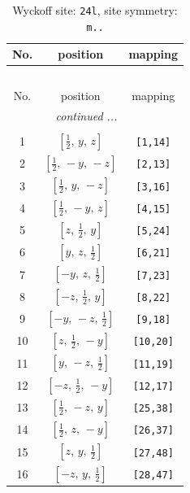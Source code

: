 \documentclass[fleqn,8pt]{jsarticle}
\begin{document}
\renewcommand{\arraystretch}{1.2}
\begin{longtable}{ccc}
\caption{Wyckoff site: {\tt 24l}, site symmetry: {\tt m..}}
 \\
 \hline \hline
No. & position & mapping \\ \hline \endfirsthead

\multicolumn{2}{l}{\tablename\ \thetable{}} \\
 \hline \hline
No. & position & mapping \\ \hline \endhead

 \hline \hline
\multicolumn{2}{r}{\footnotesize\it continued ...} \\ \endfoot

 \hline \hline
\multicolumn{2}{r}{} \\ \endlastfoot

1 & $\left[ \frac{1}{2},\, y,\, z \right]$ & {\tt [1,14]} \\ \hline
2 & $\left[ \frac{1}{2},\, - y,\, - z \right]$ & {\tt [2,13]} \\ \hline
3 & $\left[ \frac{1}{2},\, y,\, - z \right]$ & {\tt [3,16]} \\ \hline
4 & $\left[ \frac{1}{2},\, - y,\, z \right]$ & {\tt [4,15]} \\ \hline
5 & $\left[ z,\, \frac{1}{2},\, y \right]$ & {\tt [5,24]} \\ \hline
6 & $\left[ y,\, z,\, \frac{1}{2} \right]$ & {\tt [6,21]} \\ \hline
7 & $\left[ - y,\, z,\, \frac{1}{2} \right]$ & {\tt [7,23]} \\ \hline
8 & $\left[ - z,\, \frac{1}{2},\, y \right]$ & {\tt [8,22]} \\ \hline
9 & $\left[ - y,\, - z,\, \frac{1}{2} \right]$ & {\tt [9,18]} \\ \hline
10 & $\left[ z,\, \frac{1}{2},\, - y \right]$ & {\tt [10,20]} \\ \hline
11 & $\left[ y,\, - z,\, \frac{1}{2} \right]$ & {\tt [11,19]} \\ \hline
12 & $\left[ - z,\, \frac{1}{2},\, - y \right]$ & {\tt [12,17]} \\ \hline
13 & $\left[ \frac{1}{2},\, - z,\, y \right]$ & {\tt [25,38]} \\ \hline
14 & $\left[ \frac{1}{2},\, z,\, - y \right]$ & {\tt [26,37]} \\ \hline
15 & $\left[ z,\, y,\, \frac{1}{2} \right]$ & {\tt [27,48]} \\ \hline
16 & $\left[ - z,\, y,\, \frac{1}{2} \right]$ & {\tt [28,47]} \\ \hline

\end{longtable}
\end{document}
